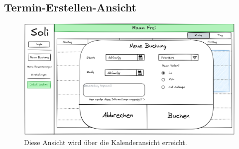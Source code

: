\documentclass{sdqbeamer}
\begin{document}
\subsection{Termin-Erstellen-Ansicht}
\begin{frame}
    \begin{figure}
        \centering
        \includegraphics[width=\textwidth]{pictures/figures/ui/buchungsdialog}
        \caption{Diese Ansicht wird über die Kalenderansicht erreicht.}
        \label{fig:terminerstellen}
    \end{figure}
\end{frame}
\end{document}
